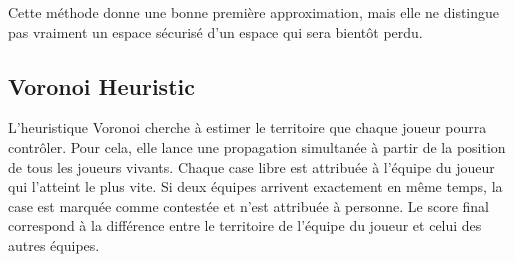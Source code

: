 \documentclass[11pt,a4paper]{article}
\begin{document}
\begin{algorithm}[H]
\DontPrintSemicolon
{}



\BlankLine

\caption{Heuristique d'Espace Libre (BFS)}
\end{algorithm}

Cette méthode donne une bonne première approximation, mais elle ne distingue pas vraiment un espace sécurisé d'un espace qui sera bientôt perdu.

\subsection{Voronoi Heuristic}

L'heuristique Voronoi cherche à estimer le territoire que chaque joueur pourra contrôler. Pour cela, elle lance une propagation simultanée à partir de la position de tous les joueurs vivants. Chaque case libre est attribuée à l'équipe du joueur qui l'atteint le plus vite. Si deux équipes arrivent exactement en même temps, la case est marquée comme contestée et n'est attribuée à personne. Le score final correspond à la différence entre le territoire de l'équipe du joueur et celui des autres équipes.
\end{document}

